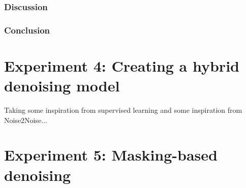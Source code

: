 \subsubsection{Discussion}
\subsubsection{Conclusion}




\section{Experiment 4: Creating a hybrid denoising model}

Taking some inspiration from supervised learning and some inspiration from Noise2Noise...

\section{Experiment 5: Masking-based denoising}







